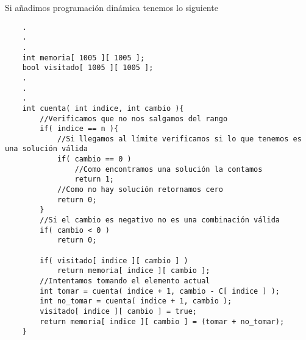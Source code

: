 Si añadimos programación dinámica tenemos lo siguiente

\begin{lstlisting}
    .
    .
    .
    int memoria[ 1005 ][ 1005 ];
    bool visitado[ 1005 ][ 1005 ];
    .
    .
    .
    int cuenta( int indice, int cambio ){
        //Verificamos que no nos salgamos del rango
        if( indice == n ){
            //Si llegamos al límite verificamos si lo que tenemos es una solución válida
            if( cambio == 0 )
                //Como encontramos una solución la contamos
                return 1;
            //Como no hay solución retornamos cero
            return 0;
        }
        //Si el cambio es negativo no es una combinación válida
        if( cambio < 0 )
            return 0;
    
        if( visitado[ indice ][ cambio ] )
            return memoria[ indice ][ cambio ];
        //Intentamos tomando el elemento actual
        int tomar = cuenta( indice + 1, cambio - C[ indice ] );
        int no_tomar = cuenta( indice + 1, cambio );
        visitado[ indice ][ cambio ] = true;
        return memoria[ indice ][ cambio ] = (tomar + no_tomar);
    }
\end{lstlisting}


